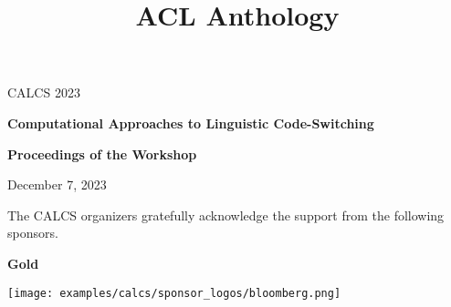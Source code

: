 \documentclass[11pt,oneside]{book}
\date{}
\title{ACL Anthology}
\begin{document}
\begin{titlepage}
  \begin{center}
    \vspace{1.5cm}

    {\LARGE CALCS 2023}

    \vspace*{65mm}

    {\bf\LARGE Computational Approaches to Linguistic Code-Switching}

    \vspace*{5cm}

    {\bf\LARGE Proceedings of the Workshop}

    \vfill

    {\LARGE December 7, 2023}
  \end{center}
\end{titlepage}
\newpage

\setcounter{page}{2}
{}
\vspace*{2cm}
\noindent

{\Large The CALCS organizers gratefully acknowledge the support from the following sponsors.}
\bigskip

\vspace*{1cm}


    \begin{samepage}
  \noindent
  {\Large \textbf{Gold}}

  \nopagebreak
            \begin{minipage}[c][0.21\linewidth][c]{0.21\linewidth}
        \texttt{[image: examples/calcs/sponsor\_logos/bloomberg.png]}
      \end{minipage}\hspace{0.05\linewidth}
    
    \end{samepage}

  \bigskip
  \bigskip
\newpage
\end{document}
